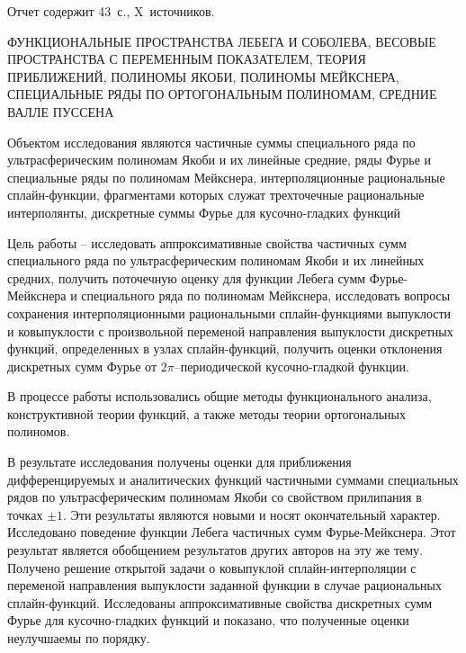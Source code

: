 \Referat %
Отчет содержит 43~с., X~источников.

ФУНКЦИОНАЛЬНЫЕ ПРОСТРАНСТВА ЛЕБЕГА И СОБОЛЕВА,
ВЕСОВЫЕ ПРОСТРАНСТВА С ПЕРЕМЕННЫМ ПОКАЗАТЕЛЕМ,
ТЕОРИЯ ПРИБЛИЖЕНИЙ,
ПОЛИНОМЫ ЯКОБИ,
ПОЛИНОМЫ МЕЙКСНЕРА,
СПЕЦИАЛЬНЫЕ РЯДЫ ПО ОРТОГОНАЛЬНЫМ ПОЛИНОМАМ,
СРЕДНИЕ ВАЛЛЕ ПУССЕНА


Объектом исследования являются частичные суммы специального ряда по ультрасферическим полиномам Якоби и их линейные средние, ряды Фурье и специальные ряды по полиномам Мейкснера, интерполяционные рациональные сплайн-функции, фрагментами которых служат трехточечные  рациональные интерполянты, дискретные суммы Фурье для кусочно-гладких функций

Цель работы -- исследовать аппроксимативные свойства частичных сумм специального ряда по ультрасферическим полиномам Якоби и их линейных средних, получить поточечную оценку для функции Лебега сумм Фурье-Мейкснера и специального ряда по полиномам Мейкснера, исследовать вопросы сохранения интерполяционными рациональными
сплайн-функциями выпуклости и ковыпуклости с произвольной переменой направления выпуклости дискретных функций, определенных в узлах сплайн-функций, получить оценки отклонения дискретных сумм Фурье от $2\pi$--периодической кусочно-гладкой функции.

В процессе работы использовались общие методы функционального анализа, конструктивной теории функций, а также методы теории ортогональных полиномов.

В результате исследования получены оценки для приближения дифференцируемых и аналитических функций частичными суммами специальных рядов по ультрасферическим полиномам Якоби со свойством прилипания в точках $\pm1$. Эти результаты являются новыми и носят окончательный характер.
Исследовано поведение функции Лебега частичных сумм Фурье-Мейкснера. Этот результат является обобщением результатов других авторов на эту же тему.
Получено решение открытой задачи о ковыпуклой сплайн-интерполяции с переменой направления выпуклости заданной функции в случае рациональных сплайн-функций.
Исследованы аппроксимативные свойства дискретных сумм Фурье для кусочно-гладких функций и показано, что полученные оценки неулучшаемы по порядку.

